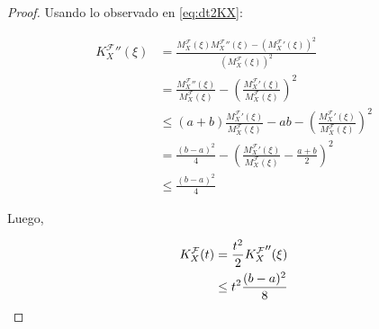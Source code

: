 \begin{proof}
    Usando lo observado en \eqref{eq:dt2KX}:

    \begin{align*}
        {K^\mathcal{F}_X}''(\xi) & = \frac{M^\mathcal{F}_X(\xi){M^\mathcal{F}_X}''(\xi) - ({M^\mathcal{F}_X}'(\xi))^2}{(M^\mathcal{F}_X(\xi))^2}                               \\
                                 & = \frac{{M^\mathcal{F}_X}''(\xi)}{M^\mathcal{F}_X(\xi)} - \left(\frac{{M^\mathcal{F}_X}'(\xi)}{M^\mathcal{F}_X(\xi)} \right)^2              \\
                                 & \leq (a+b) \frac{{M^\mathcal{F}_X}'(\xi)}{M^\mathcal{F}_X(\xi)} -ab -  \left(\frac{{M^\mathcal{F}_X}'(\xi)}{M^\mathcal{F}_X(\xi)} \right)^2 \\
                                 & = \frac{(b-a)^2}{4} - \left(\frac{{M^\mathcal{F}_X}'(\xi)}{M^\mathcal{F}_X(\xi)} -\frac{a+b}{2}\right)^2                                    \\
                                 & \leq \frac{(b-a)^2}{4}
    \end{align*}

    Luego,

    \begin{align*}
        K_X^\mathcal{F}(t) & = \frac{t^2}{2}{K_X^\mathcal{F}}''(\xi) \\
                           & \leq t^2\frac{(b-a)^2}{8} \qedhere
    \end{align*}

\end{proof}
